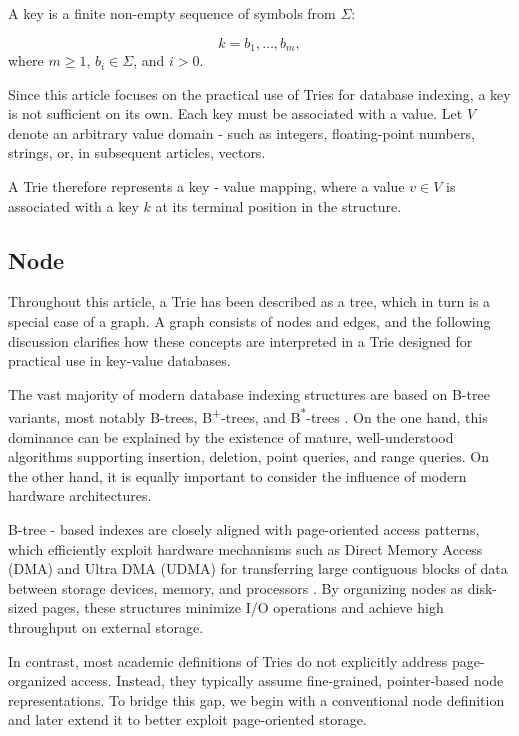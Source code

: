 \documentclass[11pt,twoside]{article}
\begin{document}
    A key is a finite non-empty sequence of symbols from $\Sigma$:

    \begin{equation}
        k = b_{1}, \ldots, b_{m},
    \end{equation}
    where $m \geq 1$, $b_{i} \in \Sigma$, and $i > 0$.

    Since this article focuses on the practical use of Tries for database
    indexing, a key is not sufficient on its own. Each key must be
    associated with a value. Let $V$ denote an arbitrary value domain - such
    as integers, floating-point numbers, strings, or, in subsequent
    articles, vectors.

    A Trie therefore represents a key - value mapping, where a value
    \(v \in V\) is associated with a key $k$ at its terminal position in the
    structure.

    \subsection{Node}\label{node}

    Throughout this article, a Trie has been described as a tree, which in
    turn is a special case of a graph. A graph consists of nodes and edges,
    and the following discussion clarifies how these concepts are
    interpreted in a Trie designed for practical use in key-value
    databases.

    The vast majority of modern database indexing structures are based on
    B-tree variants, most notably B-trees, B\textsuperscript{+}-trees, and B\textsuperscript{*}-trees
    \cite{silberschatz2019database,idreos2019design}.
    On the one hand, this dominance can be explained by the existence
    of mature, well-understood algorithms supporting insertion, deletion,
    point queries, and range queries. On the other hand, it is equally
    important to consider the influence of modern hardware architectures.

    B-tree - based indexes are closely aligned with page-oriented access
    patterns, which efficiently exploit hardware mechanisms such as Direct
    Memory Access (DMA) and Ultra DMA (UDMA) for transferring large
    contiguous blocks of data between storage devices, memory, and
    processors \cite{fent2020low,vogel2023towards,lasch2024heterogeneous}.
    By organizing nodes as disk-sized pages, these
    structures minimize I/O operations and achieve high throughput on
    external storage.

    In contrast, most academic definitions of Tries do not explicitly
    address page-organized access. Instead, they typically assume
    fine-grained, pointer-based node representations. To bridge this gap, we
    begin with a conventional node definition and later extend it to better
    exploit page-oriented storage.
\end{document}
